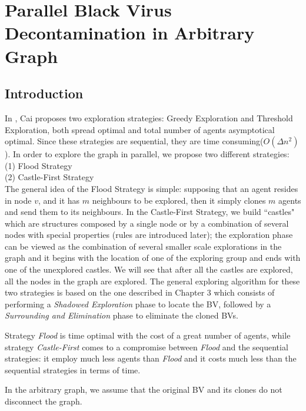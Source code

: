 \chapter {Parallel Black Virus Decontamination in Arbitrary Graph}
\label{TL}

\section{Introduction}
In \cite{cai}, Cai proposes two exploration strategies: Greedy Exploration and Threshold Exploration, both spread optimal and total number of agents asymptotical optimal. Since these strategies are sequential, they are time consuming($O(\Delta n^2)$).  In order to explore the graph in parallel, we propose two different strategies: \\
(1) Flood Strategy\\
(2) Castle-First Strategy\\
The general idea of the Flood Strategy is simple: supposing that an agent resides in node $v$, and it has $m$ neighbours  to be explored, then it simply clones $m$ agents and send them to its neighbours. In the Castle-First Strategy, we build ``castles" which are structures composed by  a single node or by a combination of several nodes with special properties (rules are introduced later); the exploration phase can be viewed as the combination of several smaller scale explorations in the graph and it begins with the location of one of the exploring group and ends with one of the unexplored castles. We will see that after all the castles are explored, all the nodes in the graph are explored. The general exploring algorithm for these two strategies is based on the one described in Chapter 3 which consists of performing a {\em Shadowed Exploration} phase to locate the BV, followed by a {\em Surrounding and Elimination} phase to eliminate the cloned BVs. 

Strategy {\em Flood}  is time optimal with the cost of a great number of agents,
 while strategy {\em Castle-First} comes to a compromise between  {\em Flood} and the sequential strategies: it employ much less agents than  {\em Flood} and it costs much less  than the sequential strategies in terms of time. 

\color{blue}In the arbitrary graph, we assume that  the original BV and its clones do not disconnect the graph.
\color{black}
